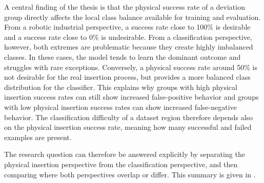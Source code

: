A central finding of the thesis is that the physical success rate of a deviation group directly affects the local class balance available for training and evaluation. From a robotic industrial perspective, a success rate close to 100\% is desirable and a success rate close to 0\% is undesirable. From a classification perspective, however, both extremes are problematic because they create highly imbalanced classes. In these cases, the model tends to learn the dominant outcome and struggles with rare exceptions. Conversely, a physical success rate around 50\% is not desirable for the real insertion process, but provides a more balanced class distribution for the classifier. This explains why groups with high physical insertion success rates can still show increased false-positive behavior and groups with low physical insertion success rates can show increased false-negative behavior. The classification difficulty of a dataset region therefore depends also on the physical insertion success rate, meaning how many successful and failed examples are present.

The research question can therefore be answered explicitly by separating the physical insertion perspective from the classification perspective, and then comparing where both perspectives overlap or differ. This summary is given in .

